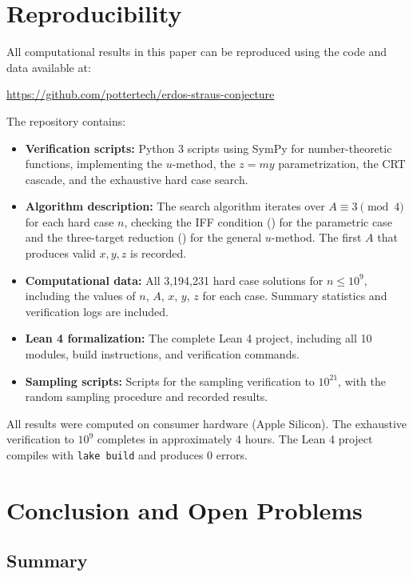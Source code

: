 \documentclass[11pt,a4paper]{article}
\theoremstyle{plain}
\theoremstyle{plain}
\theoremstyle{definition}
\numberwithin{equation}{section}
\begin{document}
\clearpage

\section{Reproducibility}

All computational results in this paper can be reproduced using the code and data available at:
\begin{center}
\url{https://github.com/pottertech/erdos-straus-conjecture}
\end{center}

The repository contains:
\begin{itemize}[noitemsep]
  \item \textbf{Verification scripts:} Python 3 scripts using SymPy for number-theoretic functions, implementing the $u$-method, the $z = my$ parametrization, the CRT cascade, and the exhaustive hard case search.
  \item \textbf{Algorithm description:} The search algorithm iterates over $A \equiv 3 \pmod{4}$ for each hard case $n$, checking the IFF condition () for the parametric case and the three-target reduction () for the general $u$-method. The first $A$ that produces valid $x, y, z$ is recorded.
  \item \textbf{Computational data:} All 3,194,231 hard case solutions for $n \leq 10^9$, including the values of $n$, $A$, $x$, $y$, $z$ for each case. Summary statistics and verification logs are included.
  \item \textbf{Lean 4 formalization:} The complete Lean 4 project, including all 10 modules, build instructions, and verification commands.
  \item \textbf{Sampling scripts:} Scripts for the sampling verification to $10^{21}$, with the random sampling procedure and recorded results.
\end{itemize}

All results were computed on consumer hardware (Apple Silicon). The exhaustive verification to $10^9$ completes in approximately 4 hours. The Lean 4 project compiles with \texttt{lake build} and produces 0 errors.

\clearpage

\section{Conclusion and Open Problems}

\subsection{Summary}
\end{document}
